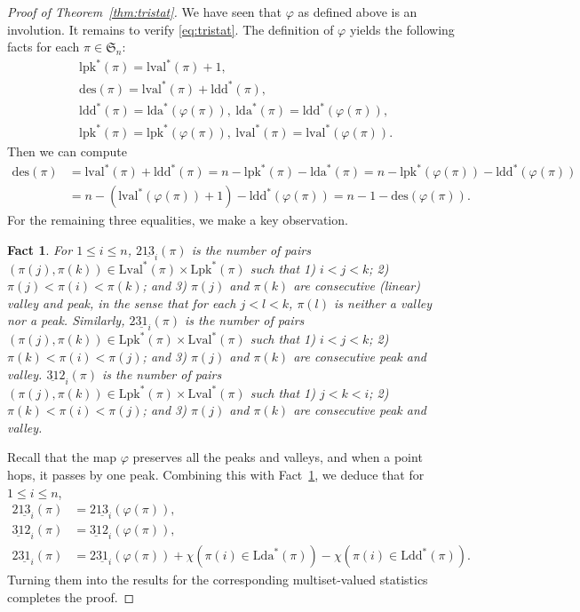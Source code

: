 \documentclass[12pt]{amsart}
\numberwithin{equation}{section}
\theoremstyle{plain}
\newtheorem{Fact}[theorem]{Fact}
\theoremstyle{definition}
\def\SS{\mathfrak{S}}
\def\des{\mathrm{des}}
\def\Lpk{\mathrm{Lpk}}
\def\Lval{\mathrm{Lval}}
\def\Lda{\mathrm{Lda}}
\def\Ldd{\mathrm{Ldd}}
\def\lpk{\mathrm{lpk}}
\def\lval{\mathrm{lval}}
\def\lda{\mathrm{lda}}
\def\ldd{\mathrm{ldd}}
\def\pprs{\mathrm{2\underline{13}}}
\def\ppwrs{\mathrm{2\underline{31}}}
\def\pp31-2{\mathrm{\underline{31}2}}
\begin{document}

\begin{proof}[Proof of Theorem~\ref{thm:tristat}]
We have seen that $\varphi$ as defined above is an involution. It remains to verify \eqref{eq:tristat}. The definition of $\varphi$ yields the following facts for each $\pi\in\SS_n$:
\begin{align*}
& \lpk^*(\pi)=\lval^*(\pi)+1,\\
& \des(\pi)=\lval^*(\pi)+\ldd^*(\pi),\\
& \ldd^*(\pi)=\lda^*(\varphi(\pi)),~\lda^*(\pi)=\ldd^*(\varphi(\pi)),\\
& \lpk^*(\pi)=\lpk^*(\varphi(\pi)),~\lval^*(\pi)=\lval^*(\varphi(\pi)).
\end{align*}
Then we can compute
\begin{align*}
\des(\pi) &= \lval^*(\pi)+\ldd^*(\pi) = n-\lpk^*(\pi)-\lda^*(\pi) = n-\lpk^*(\varphi(\pi))-\ldd^*(\varphi(\pi))\\
&= n-(\lval^*(\varphi(\pi))+1)-\ldd^*(\varphi(\pi)) = n-1-\des(\varphi(\pi)).
\end{align*}
For the remaining three equalities, we make a key observation.
\begin{Fact}\label{fact:pkval}
For $1\le i\le n$, $\pprs_i(\pi)$ is the number of pairs $(\pi(j),\pi(k))\in\Lval^*(\pi)\times\Lpk^*(\pi)$ such that 1) $i<j<k$; 2) $\pi(j)<\pi(i)<\pi(k)$; and 3) $\pi(j)$ and $\pi(k)$ are consecutive (linear) valley and peak, in the sense that for each $j<l<k$, $\pi(l)$ is neither a valley nor a peak. Similarly, $\ppwrs_i(\pi)$ is the number of pairs $(\pi(j),\pi(k))\in\Lpk^*(\pi)\times\Lval^*(\pi)$ such that 1) $i<j<k$; 2) $\pi(k)<\pi(i)<\pi(j)$; and 3) $\pi(j)$ and $\pi(k)$ are consecutive peak and valley. $\pp31-2_i(\pi)$ is the number of pairs $(\pi(j),\pi(k))\in\Lpk^*(\pi)\times\Lval^*(\pi)$ such that 1) $j<k<i$; 2) $\pi(k)<\pi(i)<\pi(j)$; and 3) $\pi(j)$ and $\pi(k)$ are consecutive peak and valley.
\end{Fact}
Recall that the map $\varphi$ preserves all the peaks and valleys, and when a point hops, it passes by one peak. Combining this with Fact~\ref{fact:pkval}, we deduce that for $1\le i\le n$,
\begin{align*}
\pprs_i(\pi) &=\pprs_i(\varphi(\pi)),\\
\pp31-2_i(\pi) &=\pp31-2_i(\varphi(\pi)),\\
\ppwrs_i(\pi) &=\ppwrs_i(\varphi(\pi))+\chi(\pi(i)\in\Lda^*(\pi))-\chi(\pi(i)\in\Ldd^*(\pi)).
\end{align*}
Turning them into the results for the corresponding multiset-valued statistics completes the proof.
\end{proof}
\end{document}
